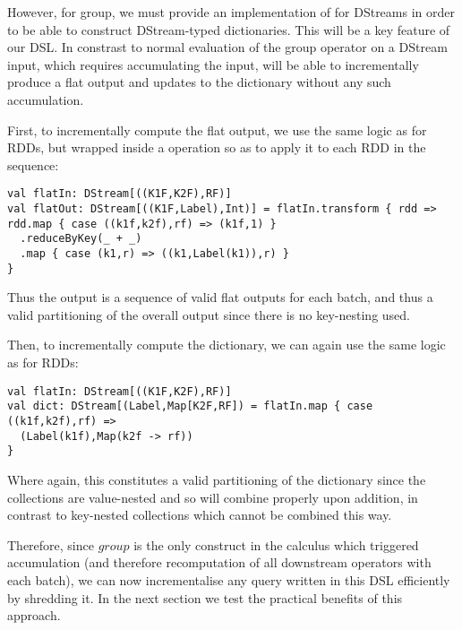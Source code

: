 However, for group, we must provide an implementation of  for DStreams in order to be able to construct DStream-typed dictionaries. This will be a key feature of our DSL. In constrast to normal evaluation of the group operator on a DStream input, which requires accumulating the input,  will be able to incrementally produce a flat output and updates to the dictionary without any such accumulation. 

First, to incrementally compute the flat output, we use the same logic as for RDDs, but wrapped inside a  operation so as to apply it to each RDD in the sequence:
\vs\begin{lstlisting}
val flatIn: DStream[((K1F,K2F),RF)]
val flatOut: DStream[((K1F,Label),Int)] = flatIn.transform { rdd =>
rdd.map { case ((k1f,k2f),rf) => (k1f,1) }
  .reduceByKey(_ + _)
  .map { case (k1,r) => ((k1,Label(k1)),r) }
}
\end{lstlisting}\vs

Thus the output is a sequence of valid flat outputs for each batch, and thus a valid partitioning of the overall output since there is no key-nesting used.

Then, to incrementally compute the dictionary, we can again use the same logic as for RDDs:
\vs\begin{lstlisting}
val flatIn: DStream[((K1F,K2F),RF)]
val dict: DStream[(Label,Map[K2F,RF]) = flatIn.map { case ((k1f,k2f),rf) =>
  (Label(k1f),Map(k2f -> rf))
}
\end{lstlisting}\vs

Where again, this constitutes a valid partitioning of the dictionary since the collections are value-nested and so will combine properly upon addition, in contrast to key-nested collections which cannot be combined this way.

Therefore, since $group$ is the only construct in the calculus which triggered accumulation (and therefore recomputation of all downstream operators with each batch), we can now incrementalise any query written in this DSL efficiently by shredding it. In the next section we test the practical benefits of this approach.